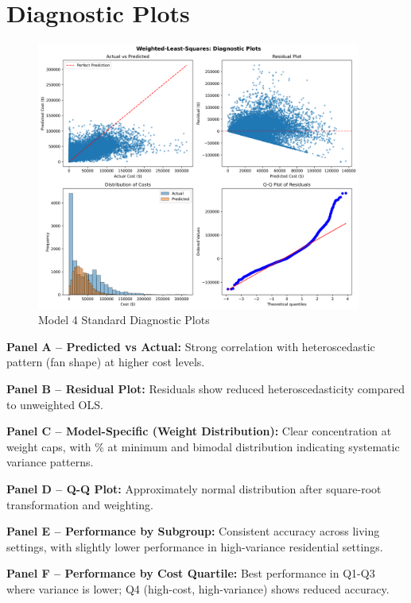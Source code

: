 \section{Diagnostic Plots}

\begin{figure}[h]
\centering
\includegraphics[width=0.95\textwidth]{models/model_4/diagnostic_plots.png}
\caption{Model 4 Standard Diagnostic Plots}
\label{fig:model4_diagnostics}
\end{figure}

\textbf{Panel A -- Predicted vs Actual:} Strong correlation with heteroscedastic pattern (fan shape) at higher cost levels.

\textbf{Panel B -- Residual Plot:} Residuals show reduced heteroscedasticity compared to unweighted OLS.

\textbf{Panel C -- Model-Specific (Weight Distribution):} Clear concentration at weight caps, with \ModelFourWeightAtMinPct{}\% at minimum and bimodal distribution indicating systematic variance patterns.

\textbf{Panel D -- Q-Q Plot:} Approximately normal distribution after square-root transformation and weighting.

\textbf{Panel E -- Performance by Subgroup:} Consistent accuracy across living settings, with slightly lower performance in high-variance residential settings.

\textbf{Panel F -- Performance by Cost Quartile:} Best performance in Q1-Q3 where variance is lower; Q4 (high-cost, high-variance) shows reduced accuracy.

